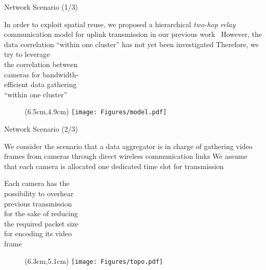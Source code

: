 \begin{frame}{Network Scenario (1/3)}
\begin{itemize}
	\myItem In order to exploit spatial reuse, we proposed a hierarchical \emph{two-hop relay} communication model for uplink transmission in our previous work~
	\myItem However, the data correlation ``within one cluster'' has not yet been investigated
	\myItem Therefore, we try to leverage \\
			the correlation between \\
			cameras for bandwidth- \\
			efficient data gathering\\
			``within one cluster''
\end{itemize}
%
\begin{figure}
\centering
\begin{textblock*}{1cm}(6.5cm,4.9cm) %
\texttt{[image: Figures/model.pdf]}
\end{textblock*}
\end{figure}
\end{frame}
\begin{frame}{Network Scenario (2/3)}
\begin{itemize}
	\myItem We consider the scenario that a data aggregator is in charge of gathering video frames from cameras through direct wireless communication links
	\myItem We assume that each camera is allocated one dedicated time slot for transmission
	\begin{itemize}
		\mySubItem Each camera has the \\
				   possibility to overhear \\
				   previous transmission \\
				   for the sake of reducing \\
				   the required packet size \\
				   for encoding its video \\
				   frame
	\end{itemize}
\end{itemize}
%
\begin{figure}
\centering
\begin{textblock*}{1cm}(6.3cm,5.1cm) %
\texttt{[image: Figures/topo.pdf]}
\end{textblock*}
\end{figure}
%
\end{frame}
